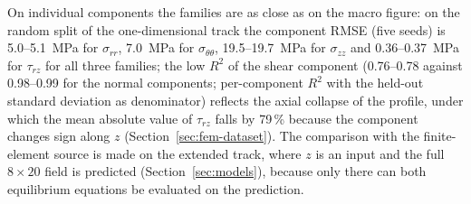 On individual components the families are as close as on the macro figure: on the random split of the one-dimensional track the component RMSE (five seeds) is 5.0--5.1~MPa for $\sigma_{rr}$, 7.0~MPa for $\sigma_{\theta\theta}$, 19.5--19.7~MPa for $\sigma_{zz}$ and 0.36--0.37~MPa for $\tau_{rz}$ for all three families; the low $R^2$ of the shear component (0.76--0.78 against 0.98--0.99 for the normal components; per-component $R^2$ with the held-out standard deviation as denominator) reflects %
the axial collapse of the profile, under which the mean absolute value of $\tau_{rz}$ falls by 79\,\% because the component changes sign along $z$ (Section~\ref{sec:fem-dataset}). The comparison with the finite-element source is made on the extended track, where $z$ is an input and the full $8\times20$ field is predicted (Section~\ref{sec:models}), because only there can both equilibrium equations be evaluated on the prediction.


